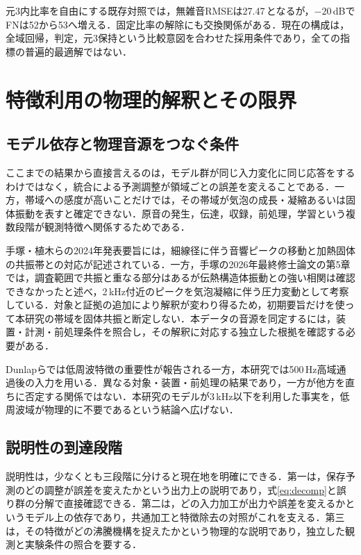 元3内比率を自由にする既存対照では，無雑音RMSEは27.47\,\kw{}となるが，$-20$\,dBでFNは52から53へ増える．固定比率の解除にも交換関係がある．現在の構成は，全域回帰，判定，元3保持という比較意図を合わせた採用条件であり，全ての指標の普遍的最適解ではない．

\section{特徴利用の物理的解釈とその限界}
\subsection{モデル依存と物理音源をつなぐ条件}
ここまでの結果から直接言えるのは，モデル群が同じ入力変化に同じ応答をするわけではなく，統合による予測調整が領域ごとの誤差を変えることである．一方，帯域への感度が高いことだけでは，その帯域が気泡の成長・凝縮あるいは固体振動を表すと確定できない．原音の発生，伝達，収録，前処理，学習という複数段階が観測特徴へ関係するためである．

手塚・植木らの2024年発表要旨\cite{tezuka2024}には，細線径に伴う音響ピークの移動と加熱固体の共振帯との対応が記述されている．一方，手塚の2026年最終修士論文\cite{tezuka2026}の第5章では，調査範囲で共振と重なる部分はあるが伝熱構造体振動との強い相関は確認できなかったと述べ，2\,kHz付近のピークを気泡凝縮に伴う圧力変動として考察している．対象と証拠の追加により解釈が変わり得るため，初期要旨だけを使って本研究の帯域を固体共振と断定しない．本データの音源を同定するには，装置・計測・前処理条件を照合し，その解釈に対応する独立した根拠を確認する必要がある．

Dunlapら\cite{dunlap2023}では低周波特徴の重要性が報告される一方，本研究では500\,Hz高域通過後の入力を用いる．異なる対象・装置・前処理の結果であり，一方が他方を直ちに否定する関係ではない．本研究のモデルが3\,kHz以下を利用した事実を，低周波域が物理的に不要であるという結論へ広げない．


\subsection{説明性の到達段階}
説明性は，少なくとも三段階に分けると現在地を明確にできる．第一は，保存予測のどの調整が誤差を変えたかという出力上の説明であり，式\eqref{eq:decomp}と誤り群の分解で直接確認できる．第二は，どの入力加工が出力や誤差を変えるかというモデル上の依存であり，共通加工と特徴除去の対照がこれを支える．第三は，その特徴がどの沸騰機構を捉えたかという物理的な説明であり，独立した観測と実験条件の照合を要する．

